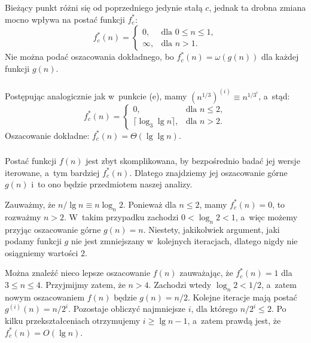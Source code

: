 \subsubsection{} %
Bieżący punkt różni się od poprzedniego jedynie stałą $c$, jednak ta drobna zmiana mocno wpływa na postać funkcji $f_c^*$:
\[
	f_c^*(n)=\left\{\begin{array}{ll}
		0, & \mbox{dla }0\le n\le 1, \\
		\infty, & \mbox{dla }n>1.
	\end{array}\right.
\]
Nie można podać oszacowania dokładnego, bo $f_c^*(n)=\omega(g(n))$ dla każdej funkcji $g(n)$.

\subsubsection{} %
Postępując analogicznie jak w~punkcie (e), mamy $\left(n^{1/3}\right)^{(i)}\equiv n^{1/3^i}$, a~stąd:
\[
	f_c^*(n)=\left\{\begin{array}{ll}
		0, & \mbox{dla }n\le 2, \\
		\lceil\log_3\lg n\rceil, & \mbox{dla }n>2.
	\end{array}\right.
\]
Oszacowanie dokładne: $f_c^*(n)=\Theta(\lg\lg n)$.

\subsubsection{} %
Postać funkcji $f(n)$ jest zbyt skomplikowana, by bezpośrednio badać jej wersje iterowane, a~tym bardziej $f_c^*(n)$. Dlatego znajdziemy jej oszacowanie górne $g(n)$ i~to ono będzie przedmiotem naszej analizy.

Zauważmy, że $n/\lg n\equiv n\log_n 2$. Ponieważ dla $n\le 2$, mamy $f_c^*(n)=0$, to rozważmy $n>2$. W~takim przypadku zachodzi $0<\log_n 2<1$, a~więc możemy przyjąc oszacowanie górne $g(n)=n$. Niestety, jakikolwiek argument, jaki podamy funkcji $g$ nie jest zmniejszany w~kolejnych iteracjach, dlatego nigdy nie osiągniemy wartości $2$.

Można znaleźć nieco lepsze oszacowanie $f(n)$ zauważając, że $f_c^*(n)=1$ dla $3\le n\le 4$. Przyjmijmy zatem, że $n>4$. Zachodzi wtedy $\log_n 2<1/2$, a~zatem nowym oszacowaniem $f(n)$ będzie $g(n)=n/2$. Kolejne iteracje mają postać $g^{(i)}(n)=n/2^i$. Pozostaje obliczyć najmniejsze $i$, dla którego $n/2^i\le 2$. Po kilku przekształceniach otrzymujemy $i\ge\lg n-1$, a~zatem prawdą jest, że $f_c^*(n)=O(\lg n)$.
